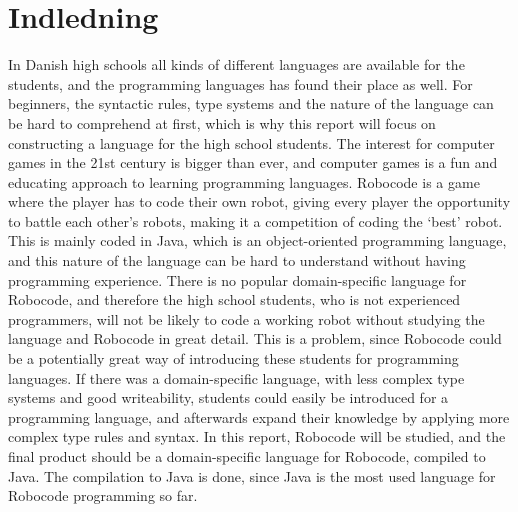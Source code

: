 \chapter{Indledning}

In Danish high schools all kinds of different languages are available for the students, and the programming languages has found their place as well. For beginners, the syntactic rules, type systems and the nature of the language can be hard to comprehend at first, which is why this report will focus on constructing a language for the high school students. The interest for computer games in the 21st century is bigger than ever, and computer games is a fun and educating approach to learning programming languages. Robocode is a game where the player has to code their own robot, giving every player the opportunity to battle each other’s robots, making it a competition of coding the ‘best’ robot. This is mainly coded in Java, which is an object-oriented programming language, and this nature of the language can be hard to understand without having programming experience. There is no popular domain-specific language for Robocode, and therefore the high school students, who is not experienced programmers, will not be likely to code a working robot without studying the language and Robocode in great detail.
This is a problem, since Robocode could be a potentially great way of introducing these students for programming languages. If there was a domain-specific language, with less complex type systems and good writeability, students could easily be introduced for a programming language, and afterwards expand their knowledge by applying more complex type rules and syntax. In this report, Robocode will be studied, and the final product should be a domain-specific language for Robocode, compiled to Java. The compilation to Java is done, since Java is the most used language for Robocode programming so far.
	